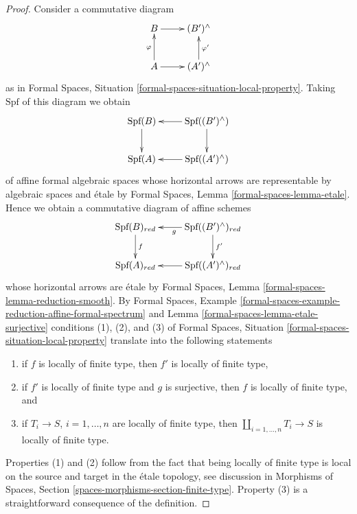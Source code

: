 \documentclass[10pt,a4paper]{amsart}
\theoremstyle{plain}
\theoremstyle{definition}
\theoremstyle{remark}
\numberwithin{equation}{subsection}
\begin{document}
\begin{proof}
Consider a commutative diagram
$$
\xymatrix{
B \ar[r] & (B')^\wedge \\
A \ar[r] \ar[u]^\varphi & (A')^\wedge \ar[u]_{\varphi'}
}
$$
as in Formal Spaces, Situation
\ref{formal-spaces-situation-local-property}.
Taking $\text{Spf}$ of this diagram we obtain
$$
\xymatrix{
\text{Spf}(B) \ar[d] &
\text{Spf}((B')^\wedge) \ar[l] \ar[d] \\
\text{Spf}(A) &
\text{Spf}((A')^\wedge) \ar[l]
}
$$
of affine formal algebraic spaces whose horizontal arrows are
representable by algebraic spaces and \'etale by
Formal Spaces, Lemma \ref{formal-spaces-lemma-etale}.
Hence we obtain a commutative diagram of affine schemes
$$
\xymatrix{
\text{Spf}(B)_{red} \ar[d]^f &
\text{Spf}((B')^\wedge)_{red} \ar[l]^g \ar[d]^{f'} \\
\text{Spf}(A)_{red} &
\text{Spf}((A')^\wedge)_{red} \ar[l]
}
$$
whose horizontal arrows are \'etale by
Formal Spaces, Lemma \ref{formal-spaces-lemma-reduction-smooth}.
By Formal Spaces, Example
\ref{formal-spaces-example-reduction-affine-formal-spectrum} and
Lemma \ref{formal-spaces-lemma-etale-surjective}
conditions (1), (2), and (3) of
Formal Spaces, Situation
\ref{formal-spaces-situation-local-property}
translate into the following statements
\begin{enumerate}
\item if $f$ is locally of finite type, then $f'$ is locally of finite type,
\item if $f'$ is locally of finite type and $g$ is surjective, then
$f$ is locally of finite type, and
\item if $T_i \to S$, $i = 1, \ldots, n$ are locally of finite type, then
$\coprod_{i = 1, \ldots, n} T_i \to S$ is locally of finite type.
\end{enumerate}
Properties (1) and (2) follow from the fact that being locally
of finite type is local on the source and target in the
\'etale topology, see discussion in
Morphisms of Spaces, Section \ref{spaces-morphisms-section-finite-type}.
Property (3) is a straightforward consequence of the definition.
\end{proof}
\end{document}
